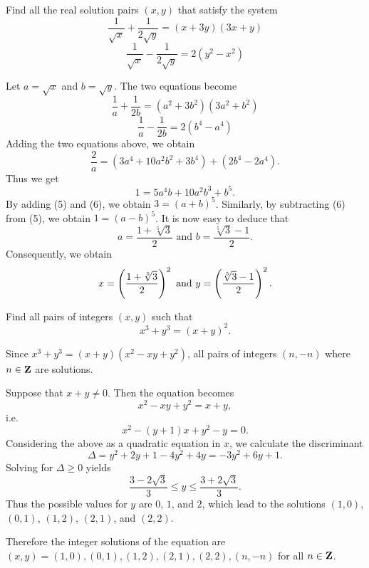 \begin{prbm}
Find all the real solution pairs $(x,y)$ that satisfy the system
\begin{equation*}\tag{1}
\frac{1}{\sqrt{x}}+\frac{1}{2\sqrt{y}}=(x+3y)(3x+y)
\end{equation*}
\begin{equation*}\tag{2}
\frac{1}{\sqrt{x}}-\frac{1}{2\sqrt{y}}=2(y^2-x^2)
\end{equation*}
\end{prbm}

\begin{solution}
Let $a=\sqrt{x}$ and $b=\sqrt{y}$. The two equations become
\begin{equation*}\tag{3}
\frac{1}{a}+\frac{1}{2b}=(a^2+3b^2)(3a^2+b^2)
\end{equation*}
\begin{equation*}\tag{4}
\frac{1}{a}-\frac{1}{2b}=2(b^4-a^4)
\end{equation*}
Adding the two equations above, we obtain
\[ \frac{2}{a}=(3a^4+10a^2b^2+3b^4)+(2b^4-2a^4). \]
Thus we get
\begin{equation*}\tag{5}
1=5a^4b+10a^2b^3+b^5.
\end{equation*}
By adding (5) and (6), we obtain $3=(a+b)^5$. Similarly, by subtracting (6) from (5), we obtain $1=(a-b)^5$. It is now easy to deduce that
\[ a=\frac{1+\sqrt[5]{3}}{2}\text{ and }b=\frac{\sqrt[5]{3}-1}{2}. \]
Consequently, we obtain
\[ x=\left(\frac{1+\sqrt[5]{3}}{2}\right)^2\text{ and }y=\left(\frac{\sqrt[5]{3}-1}{2}\right)^2. \]
\end{solution}

\pagebreak

\begin{prbm}
Find all pairs of integers $(x,y)$ such that
\[ x^3+y^3=(x+y)^2. \]
\end{prbm}

\begin{solution}
Since $x^3+y^3=(x+y)(x^2-xy+y^2)$, all pairs of integers $(n,-n)$ where $n\in\mathbf Z$ are solutions.

Suppose that $x+y\neq0$. Then the equation becomes
\[ x^2-xy+y^2=x+y, \]
i.e.
\[ x^2-(y+1)x+y^2-y=0. \]
Considering the above as a quadratic equation in $x$, we calculate the discriminant
\[ \Delta=y^2+2y+1-4y^2+4y=-3y^2+6y+1. \]
Solving for $\Delta\ge0$ yields
\[ \frac{3-2\sqrt{3}}{3}\le y\le\frac{3+2\sqrt{3}}{3}. \]
Thus the possible values for $y$ are $0$, $1$, and $2$, which lead to the solutions $(1,0)$, $(0,1)$, $(1,2)$, $(2,1)$, and $(2,2)$.

Therefore the integer solutions of the equation are $(x,y)=(1,0),(0,1),(1,2),(2,1),(2,2),(n,-n)$ for all $n\in\mathbf Z$.
\end{solution}
\pagebreak

